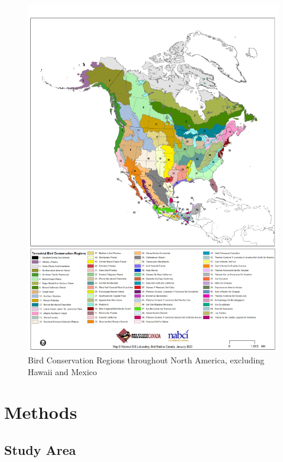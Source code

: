 \documentclass[
  letterpaper,
  DIV=11,
  numbers=noendperiod,
  oneside]{scrreprt}
\begin{document}
\begin{figure}

{\centering \includegraphics{./BCR_Terrestrial.png}

}

\caption{\label{fig-bcr-regions}Bird Conservation Regions throughout
North America, excluding Hawaii and Mexico}

\end{figure}


\hypertarget{methods}{%
\chapter{Methods}\label{methods}}

\hypertarget{study-area}{%
\section{Study Area}\label{study-area}}
\end{document}
